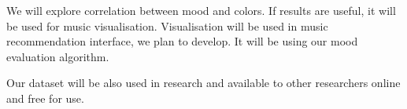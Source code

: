 \documentclass[a4paper]{article}
\begin{document}
We will explore correlation between mood and colors. If results are useful, it will be used for music visualisation. Visualisation will be used in music recommendation interface, we plan to develop. It will be using our mood evaluation algorithm. 

Our dataset will be also used in research and available to other researchers online and free for use. 

{}


\end{document}

